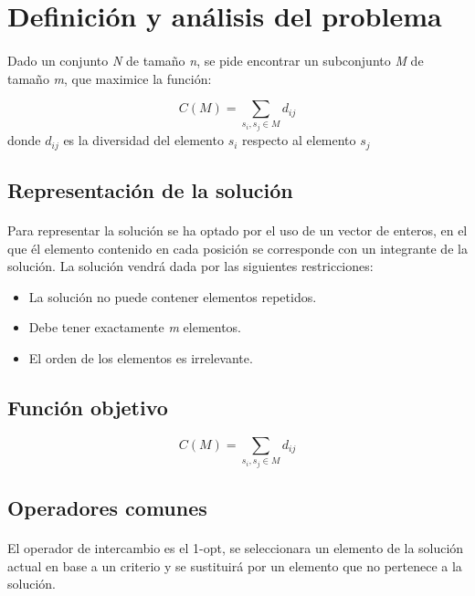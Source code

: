 \documentclass{article}
\begin{document}
	\section{Definición y análisis del problema}
	
	\paragraph{}Dado un conjunto \emph{N} de tamaño \emph{n}, se pide encontrar un subconjunto \emph{M} de tamaño \emph{m}, que maximice
	la función: 
	
		\[ C(M)=\sum_{s_i , s_j \in M} d_{ij}\]
	donde  $d_{ij}$ es la diversidad del elemento $s_i$ respecto al elemento $s_j$
	
	\subsection{Representación de la solución}
	
	\paragraph{} Para representar la solución se ha optado por el uso de un vector de enteros, en el que él elemento contenido en cada posición se corresponde con un integrante de la solución. La solución vendrá dada por las siguientes restricciones:
		\begin{itemize}
			
			\item La solución no puede contener elementos repetidos.
			
			\item Debe tener exactamente \emph{m} elementos.
			
			\item El orden de los elementos es irrelevante.
			
		\end{itemize}
	
	
	\subsection{Función objetivo}
	
	\[ C(M)=\sum_{s_i , s_j \in M} d_{ij}\]
	
	\subsection{Operadores comunes}
	
	\paragraph{}El operador de intercambio es el 1-opt, se seleccionara un elemento de la solución actual en base a un criterio y se sustituirá por un elemento que no pertenece a la solución. 
	
\end{document}
